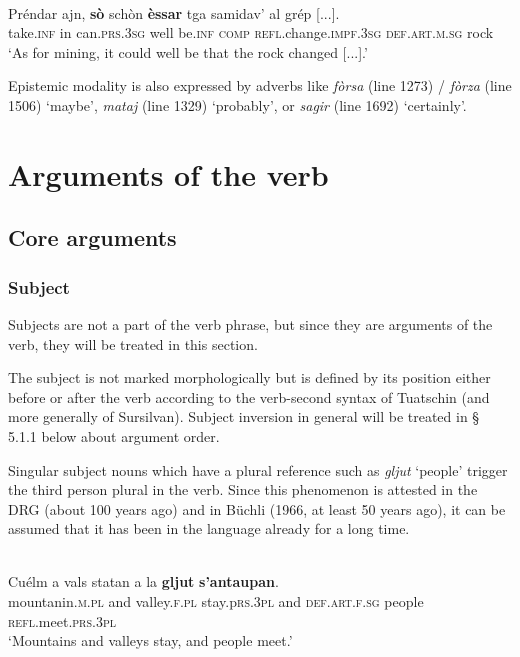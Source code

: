 \ea
\label{ex:pudsav2}
\\
\gll Préndar ajn, \textbf{sò} schòn \textbf{èssar} tga samidav’ al grép [...].\\
take.\textsc{inf} in can.\textsc{prs.3sg} well be.\textsc{inf}  \textsc{comp} \textsc{refl}.change.\textsc{impf.3sg} \textsc{def.art.m.sg} rock\\
\glt `As for mining, it could well be that the rock changed [...].'
\z

Epistemic modality is also expressed by adverbs like \textit{fòrsa} (line 1273) / \textit{fòrza} (line 1506) `maybe', \textit{mataj} (line 1329) `probably', or \textit{sagir} (line 1692) `certainly'.


\section{Arguments of the verb} 

\subsection{Core arguments}

\subsubsection{Subject}
Subjects are not a part of the verb phrase, but since they are arguments of the verb, they will be treated in this section.

The subject is not marked morphologically but is defined by its position either before or after the verb according to the verb-second syntax of Tuatschin (and more generally of Sursilvan). Subject inversion in general will be treated in § 5.1.1 below about argument order.

Singular subject nouns which have a plural reference such as \textit{gljut} `people' trigger the third person plural in the verb. Since this phenomenon is attested in the DRG (about 100 years ago) and in Büchli (1966, at least 50 years ago), it can be assumed that it has been in the language already for a long time.

\ea
\label{}
\\
\gll Cuélm a vals statan a la \textbf{gljut} \textbf{s'antaupan}.\\
mountanin.\textsc{m.pl} and valley.\textsc{f.pl} stay.p\textsc{rs.3pl} and \textsc{def.art.f.sg} people \textsc{refl}.meet.\textsc{prs.3pl}\\
\glt `Mountains and valleys stay, and people meet.'
\z

